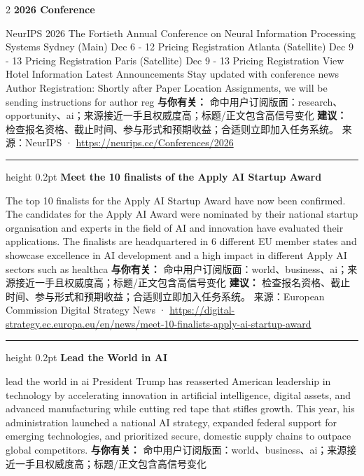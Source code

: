 \documentclass[10.5pt]{ctexart}
\begin{document}
\begin{multicols}{2}
{\large\bfseries 2026 Conference}\par
NeurIPS 2026 The Fortieth Annual Conference on Neural Information Processing Systems Sydney (Main) Dec 6 - 12 Pricing Registration Atlanta (Satellite) Dec 9 - 13 Pricing Registration Paris (Satellite) Dec 9 - 13 Pricing Registration View Hotel Information Latest Announcements Stay updated with conference news Author Registration: Shortly after Paper Location Assignments, we will be sending instructions for author reg
\textbf{与你有关：} 命中用户订阅版面：research、opportunity、ai；来源接近一手且权威度高；标题/正文包含高信号变化
\textbf{建议：} 检查报名资格、截止时间、参与形式和预期收益；合适则立即加入任务系统。
{\footnotesize\color{ormuted} 来源：NeurIPS · \url{https://neurips.cc/Conferences/2026}}
\vspace{2mm}
\hrule height 0.2pt
\vspace{2mm}
{\large\bfseries Meet the 10 finalists of the Apply AI Startup Award}\par
The top 10 finalists for the Apply AI Startup Award have now been confirmed. The candidates for the Apply AI Award were nominated by their national startup organisation and experts in the field of AI and innovation have evaluated their applications. The finalists are headquartered in 6 different EU member states and showcase excellence in AI development and a high impact in different Apply AI sectors such as healthca
\textbf{与你有关：} 命中用户订阅版面：world、business、ai；来源接近一手且权威度高；标题/正文包含高信号变化
\textbf{建议：} 检查报名资格、截止时间、参与形式和预期收益；合适则立即加入任务系统。
{\footnotesize\color{ormuted} 来源：European Commission Digital Strategy News · \url{https://digital-strategy.ec.europa.eu/en/news/meet-10-finalists-apply-ai-startup-award}}
\vspace{2mm}
\hrule height 0.2pt
\vspace{2mm}
{\large\bfseries Lead the World in AI}\par
lead the world in ai President Trump has reasserted American leadership in technology by accelerating innovation in artificial intelligence, digital assets, and advanced manufacturing while cutting red tape that stifles growth. This year, his administration launched a national AI strategy, expanded federal support for emerging technologies, and prioritized secure, domestic supply chains to outpace global competitors.
\textbf{与你有关：} 命中用户订阅版面：world、business、ai；来源接近一手且权威度高；标题/正文包含高信号变化

\end{multicols}
\end{document}

